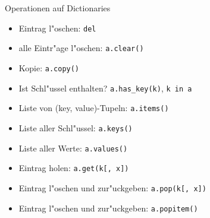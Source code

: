 \begin{frame}[fragile]{Operationen auf Dictionaries}
\begin{itemize}
\item Eintrag l"oschen: \lstinline{del}
\item alle Eintr"age l"oschen: \lstinline{a.clear()}
\item Kopie: \lstinline{a.copy()}
\item Ist Schl"ussel enthalten? \lstinline{a.has_key(k)}, \lstinline{k in a}
\item Liste von (key, value)-Tupeln: \lstinline{a.items()}
\item Liste aller Schl"ussel: \lstinline{a.keys()}
\item Liste aller Werte: \lstinline{a.values()}
\item Eintrag holen: \lstinline{a.get(k[, x])}
\item Eintrag l"oschen und zur"uckgeben: \lstinline{a.pop(k[, x])}
\item Eintrag l"oschen und zur"uckgeben:  \lstinline{a.popitem()}
\end{itemize}
\end{frame}



